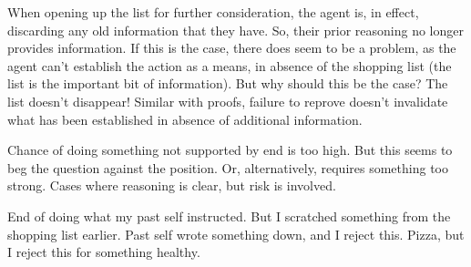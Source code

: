 \documentclass[10pt]{article}
\begin{document}

\begin{proposition}
  When opening up the list for further consideration, the agent is, in effect, discarding any old information that they have.
  So, their prior reasoning no longer provides information.
  If this is the case, there does seem to be a problem, as the agent can't establish the action as a means, in absence of the shopping list (the list is the important bit of information).
  But why should this be the case?
  The list doesn't disappear!
  Similar with proofs, failure to reprove doesn't invalidate what has been established in absence of additional information.
\end{proposition}

\begin{proposition}
  Chance of doing something not supported by end is too high.
  But this seems to beg the question against the position.
  Or, alternatively, requires something too strong.
  Cases where reasoning is clear, but risk is involved.
\end{proposition}

\begin{proposition}
  End of doing what my past self instructed.
  But I scratched something from the shopping list earlier.
  Past self wrote something down, and I reject this.
  Pizza, but I reject this for something healthy.
\end{proposition}
\end{document}
